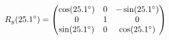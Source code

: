 \documentclass[preview]{standalone}
\begin{document}
\begin{align*}
\special{dvisvgm:raw <g id='unique000'>}R_y(25.1^\circ) = \begin{pmatrix} \cos(25.1^\circ) & 0 & -\sin(25.1^\circ) \\ 0 & 1 & 0 \\ \sin(25.1^\circ) & 0 & \cos(25.1^\circ) \end{pmatrix}\special{dvisvgm:raw </g>}
\end{align*}
\end{document}
